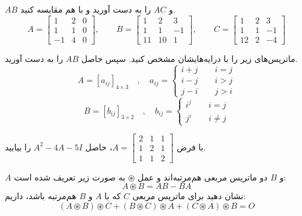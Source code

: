 \begin{problem} \label{prmat2}
	$AB$ و $AC$
	را به دست آورید و با هم مقایسه کنید.
	\[
	A=
	\begin{bmatrix}
		1 & 2 & 0 \\
		1 & 1 & 0 \\
		-1 & 4 & 0
	\end{bmatrix},
	\qquad
	B=
	\begin{bmatrix}
		1 & 2 & 3 \\
		1 & 1 & -1 \\
		11 & 10 & 1
	\end{bmatrix},
	\qquad
	C=
	\begin{bmatrix}
		1 & 2 & 3 \\
		1 & 1 & -1 \\
		12 & 2 & -4
	\end{bmatrix}
	\]
\end{problem}

\begin{problem} \label{prmat3}
	ماتریس‌های زیر را با درایه‌هایشان مشخص کنید. سپس حاصل $AB$ را به دست آورید.
	\[
	A = [a_{ij}]_{4 \times 3} \quad , \quad a_{ij} =
	\begin{cases}
		i+j \qquad i=j \\
		i-j \qquad i>j \\
		j-i \qquad j>i
	\end{cases}
	\]
	\[
	B = [b_{ij}]_{3 \times 2} \quad , \quad b_{ij} =
	\begin{cases}
		i^j \qquad i=j \\
		j^i \qquad i \neq j
	\end{cases}
	\]
\end{problem}

\begin{problem} \label{prmat4}
	با فرض
	$A=
	\begin{bmatrix}
		2 & 1 & 1 \\
		1 & 2 & 1 \\
		1 & 1 & 2
	\end{bmatrix}$،
	حاصل
	$A^2 - 4A - 5I$
	را بیابید.
\end{problem}

\begin{problem} \label{prmat5}
	$A$ و $B$
	دو ماتریس مربعی هم‌مرتبه‌اند و عمل $\circledast$ به صورت زیر تعریف شده است:
	$$A \circledast B = AB - BA$$
	نشان دهید برای ماتریس مربعی $C$ که با $A$ و $B$ هم‌مرتبه باشد، داریم:
	$$(A \circledast B) \circledast C + (B \circledast C) \circledast A + (C \circledast A) \circledast B = O$$
\end{problem}

